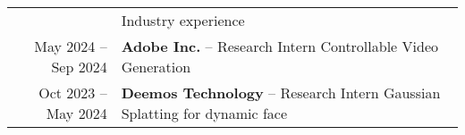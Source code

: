 \documentclass[letterpaper, 11pt]{article}
\newcommand{\headingfont}{\Large\color{OliveGreen}\vspace{-.4cm}}
\newenvironment{SectionTable}[1]{
	\renewcommand*{\arraystretch}{1.2}
	\setlength{\tabcolsep}{10pt} %
	\begin{longtable}{Rp{5.8in}} & #1 \\}
{\end{longtable}\vspace{-.4cm}}
\newenvironment{SectionTableSingleSpace}[1]{
	\renewcommand*{\arraystretch}{1.2}
	\setlength{\tabcolsep}{10pt}
	\begin{longtable}{Rp{5.4in}} & #1 \\[0.6em]}
{\end{longtable}\vspace{-.4cm}}
\begin{document}








\begin{SectionTable}{\headingfont Industry experience}
May 2024 -- Sep 2024 &
\textbf{Adobe Inc.} -- Research Intern \newline
Controllable Video Generation\\
	
Oct 2023 -- May 2024 &
\textbf{Deemos Technology} -- Research Intern \newline
Gaussian Splatting for dynamic face\\

\end{SectionTable}
\end{document}
